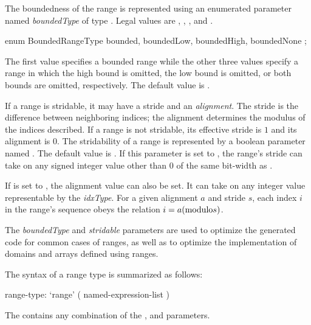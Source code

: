 
The boundedness of the range is represented using an enumerated
parameter named \emph{boundedType} of type .
Legal values are , ,
, and .  
\begin{chapel}
enum BoundedRangeType { bounded, boundedLow, boundedHigh, boundedNone };
\end{chapel}
\noindent
The first value specifies
a bounded range while the other three values specify a range in which
the high bound is omitted, the low bound is omitted, or both bounds
are omitted, respectively.  The default value is .

If a range is stridable, it may have a stride and an
\emph{alignment}.  The stride is the difference between neighboring indices; the
alignment determines the modulus of the indices described.  If a range is not
stridable, its effective stride is $1$ and its alignment is $0$.
The stridability of a range is represented by a boolean parameter
named .  The default value is .  If this parameter
is set to , the range's stride can take on any signed integer value
other than 0 of the same bit-width as .

If  is set to , the alignment value can also be set.
It can take on any integer value representable by
the \emph{idxType}.  For a given alignment $a$ and stride $s$, each index $i$
in the range's sequence obeys the relation $i = a ({\rm modulo} s)$.

\begin{rationale}
The \emph{boundedType} and \emph{stridable} parameters are used
to optimize the generated code for common cases of ranges, as well as
to optimize the implementation of domains and arrays defined using ranges.
\end{rationale}

The syntax of a range type is summarized as follows:
\begin{syntax}
range-type:
  `range' ( named-expression-list )
\end{syntax}
\noindent The  contains any combination of
  the ,  and  parameters.

